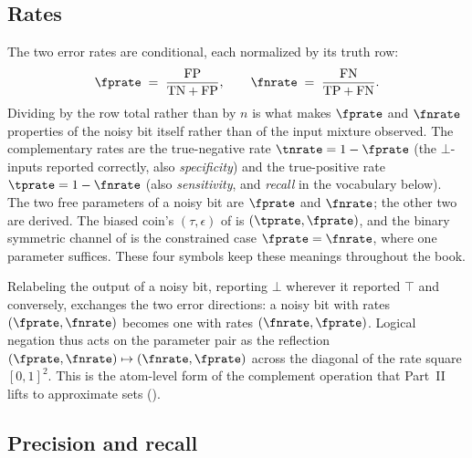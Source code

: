 \subsection*{Rates}

The two error rates are conditional, each normalized by its truth row:
\[
  \fprate \;=\; \frac{\mathrm{FP}}{\mathrm{TN} + \mathrm{FP}},
  \qquad
  \fnrate \;=\; \frac{\mathrm{FN}}{\mathrm{TP} + \mathrm{FN}}.
\]
Dividing by the row total rather than by $n$ is what makes $\fprate$ and
$\fnrate$ properties of the noisy bit itself rather than of the input mixture
observed. The complementary rates are the true-negative rate
$\tnrate = 1 - \fprate$ (the $\bot$-inputs reported correctly, also
\emph{specificity}) and the true-positive rate $\tprate = 1 - \fnrate$ (also
\emph{sensitivity}, and \emph{recall} in the vocabulary below). The two free
parameters of a noisy bit are $\fprate$ and $\fnrate$; the other two are
derived. The biased coin's $(\tau, \epsilon)$ of  is
$(\tprate, \fprate)$, and the binary symmetric channel of  is the
constrained case $\fprate = \fnrate$, where one parameter suffices. These four
symbols keep these meanings throughout the book.

\begin{remark}
\label{rem:not-swaps-rates}
Relabeling the output of a noisy bit, reporting $\bot$ wherever it reported
$\top$ and conversely, exchanges the two error directions: a noisy bit with
rates $(\fprate, \fnrate)$ becomes one with rates $(\fnrate, \fprate)$. Logical
negation thus acts on the parameter pair as the reflection
$(\fprate, \fnrate) \mapsto (\fnrate, \fprate)$ across the diagonal of the rate
square $[0,1]^2$. This is the atom-level form of the complement operation that
Part~II lifts to approximate sets ().
\end{remark}

\subsection*{Precision and recall}

